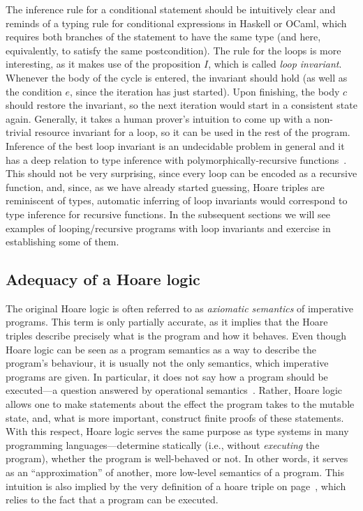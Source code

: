 The inference rule for a conditional statement should be intuitively
clear and reminds of a typing rule for conditional expressions in
Haskell or OCaml, which requires both branches of the statement to
have the same type (and here, equivalently, to satisfy the same
postcondition). The rule  for the loops is more
interesting, as it makes use of the 
proposition $I$, which is called \textit{loop invariant}. Whenever the body
of the cycle is entered, the invariant should hold (as well as the
condition $e$, since the iteration has just started). Upon finishing,
the body $c$ should restore the invariant, so the next iteration would
start in a consistent state again. Generally, it takes a human
prover's intuition to come up with a non-trivial resource invariant
for a loop, so it can be used in the rest of the program. Inference of
the best loop invariant is an undecidable problem in general and it
has a deep relation to type inference with polymorphically-recursive
functions~\cite{Henglein:TOPLAS93}. This should not be very
surprising, since every loop can be encoded as a recursive function,
and, since, as we have already started guessing, Hoare triples are
reminiscent of types, automatic inferring of loop invariants would
correspond to type inference for recursive functions. In the
subsequent sections we will see examples of looping/recursive programs
with loop invariants and exercise in establishing some of them.


\subsection{Adequacy of a Hoare logic}




The original Hoare logic is often referred to as \textit{axiomatic semantics}
of imperative programs. This term is only partially accurate, as it
implies that the Hoare triples describe precisely what is the program
and how it behaves. Even though Hoare logic can be seen as a program
semantics as a way to describe the program's behaviour, it is usually
not the only semantics, which imperative programs are given. In
particular, it does not say how a program should be executed---a
question answered by operational
semantics~\cite[Chapter~2]{Winskel:BOOK}. Rather, Hoare logic allows
one to make statements about the effect the program takes to the
mutable state, and, what is more important, construct finite proofs of
these statements. With this respect, Hoare logic serves the same
purpose as type systems in many programming languages---determine
statically (i.e., without \textit{executing} the program), whether the
program is well-behaved or not. In other words, it serves as an
``approximation'' of another, more low-level semantics of a program.
This intuition is also implied by the very definition of a hoare
triple on page~\pageref{pg:triple}, which relies to the fact that a
program can be executed.


